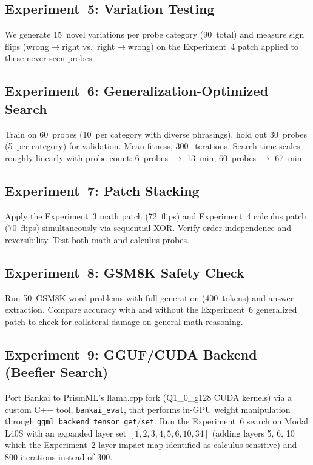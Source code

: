\documentclass[11pt,a4paper]{article}
\begin{document}
\subsection{Experiment~5: Variation Testing}

We generate 15~novel variations per probe category (90~total) and
measure sign flips (wrong$\to$right vs.\ right$\to$wrong) on the
Experiment~4 patch applied to these never-seen probes.

\subsection{Experiment~6: Generalization-Optimized Search}

Train on 60~probes (10~per category with diverse phrasings), hold out
30~probes (5~per category) for validation. Mean fitness, 300~iterations.
Search time scales roughly linearly with probe count:
6~probes $\to$ 13~min, 60~probes $\to$ 67~min.

\subsection{Experiment~7: Patch Stacking}

Apply the Experiment~3 math patch (72~flips) and Experiment~4 calculus
patch (70~flips) simultaneously via sequential XOR. Verify order
independence and reversibility. Test both math and calculus probes.

\subsection{Experiment~8: GSM8K Safety Check}

Run 50~GSM8K word problems with full generation (400~tokens) and answer
extraction. Compare accuracy with and without the Experiment~6
generalized patch to check for collateral damage on general math
reasoning.

\subsection{Experiment~9: GGUF/CUDA Backend (Beefier Search)}

Port Bankai to PrismML's llama.cpp fork (Q1\_0\_g128 CUDA kernels) via
a custom C++ tool, \texttt{bankai\_eval}, that performs in-GPU weight
manipulation through \texttt{ggml\_backend\_tensor\_get}/\texttt{set}.
Run the Experiment~6 search on Modal L40S with an expanded layer set
$[1, 2, 3, 4, 5, 6, 10, 34]$ (adding layers 5, 6, 10 which the
Experiment~2 layer-impact map identified as calculus-sensitive) and
800 iterations instead of 300.
\end{document}
